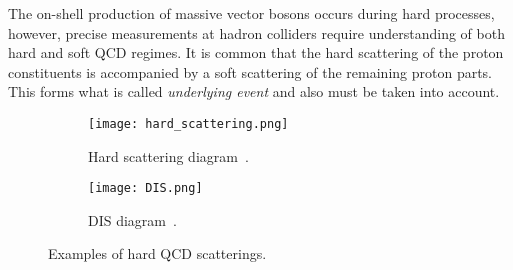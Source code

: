 		The on-shell production of massive vector bosons occurs during hard processes, however, precise measurements at hadron colliders require understanding of both hard and soft QCD regimes. It is common that the hard scattering of the proton constituents is accompanied by a soft scattering of the remaining proton parts. This forms what is called \textit{underlying event} and also must be taken into account. 
		    	\begin{figure}[htbp]
			\begin{subfigure}[t]{0.42\textwidth} 
				\texttt{[image: hard\_scattering.png]}
				\caption[Transverse view]{Hard scattering diagram~\cite{hard_interactions}.}
				\label{fig::hs}
			\end{subfigure}
			\begin{subfigure}[t]{0.52\textwidth}
				\texttt{[image: DIS.png]}
				\caption[Side view]{DIS diagram~\cite{proton_struct}.}
				\label{fig::dis}
			\end{subfigure}
			\hfill
			\caption{Examples of hard QCD scatterings.}
			\label{fig::hadron_qcd}
		\end{figure}
